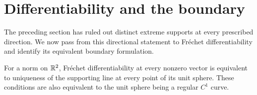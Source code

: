 \section{Differentiability and the boundary}
\label{df:sec:conclusion}

The preceding section has ruled out distinct extreme supports at
every prescribed direction. We now pass from this directional
statement to Fr\'echet differentiability and identify its equivalent
boundary formulation.

\begin{lemma}\label{df:convex-regularity}
For a norm on $\mathbb R^2$, Fr\'echet differentiability at every nonzero
vector is equivalent to uniqueness of the supporting line at every
point of its unit sphere. These conditions are also equivalent to
the unit sphere being a regular $C^1$ curve.
\end{lemma}

